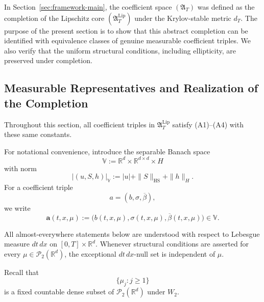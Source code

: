 \documentclass[12pt,oneside, reqno]{amsart}
\numberwithin{equation}{section}
\begin{document}
	In Section~\ref{sec:framework-main}, the coefficient space
	$(\mathfrak A_T)$ was defined as the completion of the Lipschitz core
	$(\mathfrak A_T^{\mathrm{Lip}})$ under the Krylov-stable metric
	$d_T$. The purpose of the present section is to show that this
	abstract completion can be identified with equivalence classes of
	genuine measurable coefficient triples. We also verify that the
	uniform structural conditions, including ellipticity, are preserved
	under completion.
	
	\subsection{Measurable Representatives and Realization of the Completion}
	
	Throughout this section, all coefficient triples in $\mathfrak A_T^{\mathrm{Lip}}$ satisfy  \textnormal{(A1)}--\textnormal{(A4)} with these same constants.
	
	For notational convenience, introduce the separable Banach space
	\begin{equation}
		\label{eq:coefficient-value-space}
		\mathbb V
		:=
		\mathbb R^d
		\times\mathbb R^{d\times d}
		\times H
	\end{equation}
	with norm
	\begin{equation}
		\label{eq:coefficient-value-norm}
		|(u,S,h)|_{\mathbb V}
		:=
		|u|+\|S\|_{\mathrm{HS}}+\|h\|_H.
	\end{equation}
	For a coefficient triple
	\[
	a=(b,\sigma,\overline\beta),
	\]
	we write
	\[
	\mathbf a(t,x,\mu)
	:=
	\bigl(
	b(t,x,\mu),
	\sigma(t,x,\mu),
	\overline\beta(t,x,\mu)
	\bigr)
	\in\mathbb V.
	\]
	
	All almost-everywhere statements below are understood with respect
	to Lebesgue measure $dt\,dx$ on
	$[0,T]\times\mathbb R^d$. Whenever structural conditions are
	asserted for every
	$\mu\in\mathcal P_2(\mathbb R^d)$, the exceptional
	$dt\,dx$-null set is independent of $\mu$.
	
	
	
	Recall that
	\[
	\{\mu_j:j\geq1\}
	\]
	is a fixed countable dense subset of
	$\mathcal P_2(\mathbb R^d)$ under $W_2$.
	
\end{document}
